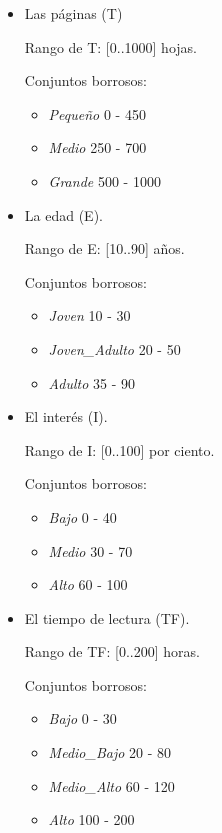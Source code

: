 \documentclass[a4paper, 8pt]{article}
\begin{document}
\begin{itemize}
\item Las páginas (T)

  Rango de T: [0..1000] hojas.

  Conjuntos borrosos:
  
  \begin{itemize}
        \item \textit{Pequeño} 0 - 450
        \item \textit{Medio} 250 - 700
        \item \textit{Grande} 500 - 1000
  \end{itemize}
  
\item La edad (E). 

  Rango de E: [10..90] años.
  
  Conjuntos borrosos:
  
  \begin{itemize}
        \item \textit{Joven} 10 - 30
        \item \textit{Joven\_Adulto} 20 - 50
        \item \textit{Adulto} 35 - 90
  \end{itemize}
        
\item El interés (I).

  Rango de I: [0..100] por ciento.
  
  Conjuntos borrosos:
  
  \begin{itemize}
        \item \textit{Bajo} 0 - 40
        \item \textit{Medio} 30 - 70
        \item \textit{Alto} 60 - 100
  \end{itemize}
  
\item El tiempo de lectura (TF).

  Rango de TF: [0..200] horas.

  Conjuntos borrosos:
  
  \begin{itemize}
        \item \textit{Bajo} 0 - 30
        \item \textit{Medio\_Bajo} 20 - 80
        \item \textit{Medio\_Alto} 60 - 120
        \item \textit{Alto} 100 - 200
  \end{itemize}
\end{itemize}
\end{document}
